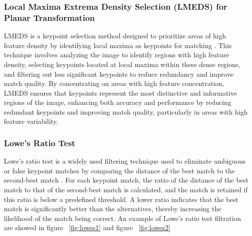 \subsubsection{Local Maxima Extrema Density Selection (LMEDS) for Planar Transformation}

LMEDS is a keypoint selection method designed to prioritize areas of high feature density by identifying local maxima as keypoints for matching \cite{farin2005video}. This technique involves analyzing the image to identify regions with high feature density, selecting keypoints located at local maxima within these dense regions, and filtering out less significant keypoints to reduce redundancy and improve match quality. By concentrating on areas with high feature concentration, LMEDS ensures that keypoints represent the most distinctive and informative regions of the image, enhancing both accuracy and performance by reducing redundant keypoints and improving match quality, particularly in areas with high feature variability.

\subsubsection{Lowe's Ratio Test}

Lowe's ratio test is a widely used filtering technique used to eliminate ambiguous or false keypoint matches by comparing the distance of the best match to the second-best match \cite{bian2020gms}. For each keypoint match, the ratio of the distance of the best match to that of the second-best match is calculated, and the match is retained if this ratio is below a predefined threshold. A lower ratio indicates that the best match is significantly better than the alternatives, thereby increasing the likelihood of the match being correct. An example of Lowe's ratio test filtration are showed in figure ~\ref{fig:lowes1} and figure ~\ref {fig:lowes2}


